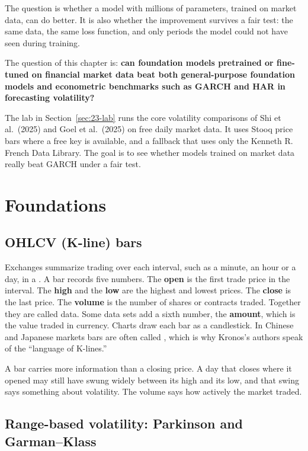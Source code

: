 The question is whether a model with millions of parameters, trained on market data, can do better. It is also whether the improvement survives a fair test: the same data, the same loss function, and only periods the model could not have seen during training.

The question of this chapter is: \textbf{can foundation models pretrained or fine-tuned on financial market data beat both general-purpose foundation models and econometric benchmarks such as GARCH and HAR in forecasting volatility?}

The lab in Section~\ref{sec:23-lab} runs the core volatility comparisons of Shi et al.\ (2025) and Goel et al.\ (2025) on free daily market data. It uses Stooq price bars where a free key is available, and a fallback that uses only the Kenneth R. French Data Library. The goal is to see whether models trained on market data really beat GARCH under a fair test.


\section{Foundations}
\label{sec:23-foundations}

\subsection{OHLCV (K-line) bars}

Exchanges summarize trading over each interval, such as a minute, an hour or a day, in a . A bar records five numbers. The \textbf{open} is the first trade price in the interval. The \textbf{high} and the \textbf{low} are the highest and lowest prices. The \textbf{close} is the last price. The \textbf{volume} is the number of shares or contracts traded. Together they are called  data. Some data sets add a sixth number, the \textbf{amount}, which is the value traded in currency. Charts draw each bar as a candlestick. In Chinese and Japanese markets bars are often called , which is why Kronos's authors speak of the ``language of K-lines.''

A bar carries more information than a closing price. A day that closes where it opened may still have swung widely between its high and its low, and that swing says something about volatility. The volume says how actively the market traded.

\subsection{Range-based volatility: Parkinson and Garman--Klass}


